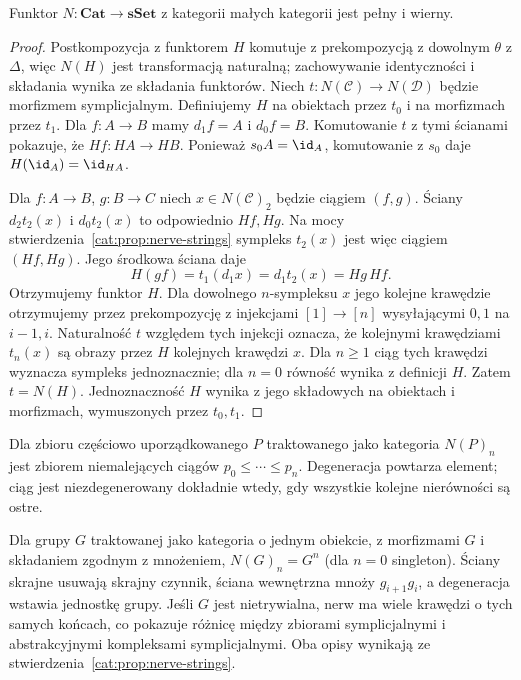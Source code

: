 \begin{twierdzenie}\label{cat:thm:nerve-fully-faithful}
Funktor $N:\mathbf{Cat}\to\mathbf{sSet}$ z kategorii małych kategorii jest pełny i wierny.
\end{twierdzenie}
\begin{proof}
Postkompozycja z funktorem $H$ komutuje z prekompozycją z dowolnym $\theta$ z $\Delta$, więc $N(H)$ jest transformacją naturalną; zachowywanie identyczności i składania wynika ze składania funktorów. Niech $t:N(\mathcal C)\to N(\mathcal D)$ będzie morfizmem symplicjalnym. Definiujemy $H$ na obiektach przez $t_0$ i na morfizmach przez $t_1$. Dla $f:A\to B$ mamy $d_1f=A$ i $d_0f=B$. Komutowanie $t$ z tymi ścianami pokazuje, że $Hf:HA\to HB$. Ponieważ $s_0A=\id_A$, komutowanie z $s_0$ daje $H(\id_A)=\id_{HA}$.

Dla $f:A\to B$, $g:B\to C$ niech $x\in N(\mathcal C)_2$ będzie ciągiem $(f,g)$. Ściany $d_2t_2(x)$ i $d_0t_2(x)$ to odpowiednio $Hf,Hg$. Na mocy stwierdzenia~\ref{cat:prop:nerve-strings} sympleks $t_2(x)$ jest więc ciągiem $(Hf,Hg)$. Jego środkowa ściana daje
\[
 H(gf)=t_1(d_1x)=d_1t_2(x)=Hg\,Hf.
\]
Otrzymujemy funktor $H$. Dla dowolnego $n$-sympleksu $x$ jego kolejne krawędzie otrzymujemy przez prekompozycję z injekcjami $[1]\to[n]$ wysyłającymi $0,1$ na $i-1,i$. Naturalność $t$ względem tych injekcji oznacza, że kolejnymi krawędziami $t_n(x)$ są obrazy przez $H$ kolejnych krawędzi $x$. Dla $n\geq1$ ciąg tych krawędzi wyznacza sympleks jednoznacznie; dla $n=0$ równość wynika z definicji $H$. Zatem $t=N(H)$. Jednoznaczność $H$ wynika z jego składowych na obiektach i morfizmach, wymuszonych przez $t_0,t_1$.
\end{proof}

\begin{przyklad}\label{cat:ex:nerve-poset-group}
Dla zbioru częściowo uporządkowanego $P$ traktowanego jako kategoria $N(P)_n$ jest zbiorem niemalejących ciągów $p_0\leq\cdots\leq p_n$. Degeneracja powtarza element; ciąg jest niezdegenerowany dokładnie wtedy, gdy wszystkie kolejne nierówności są ostre.

Dla grupy $G$ traktowanej jako kategoria o jednym obiekcie, z morfizmami $G$ i składaniem zgodnym z mnożeniem, $N(G)_n=G^n$ (dla $n=0$ singleton). Ściany skrajne usuwają skrajny czynnik, ściana wewnętrzna mnoży $g_{i+1}g_i$, a degeneracja wstawia jednostkę grupy. Jeśli $G$ jest nietrywialna, nerw ma wiele krawędzi o tych samych końcach, co pokazuje różnicę między zbiorami symplicjalnymi i abstrakcyjnymi kompleksami symplicjalnymi. Oba opisy wynikają ze stwierdzenia~\ref{cat:prop:nerve-strings}.
\end{przyklad}


